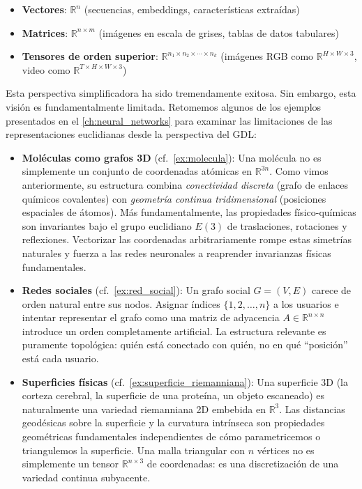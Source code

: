 \begin{itemize}
    \item \textbf{Vectores}: $\mathbb{R}^n$ (secuencias, embeddings, características extraídas)
    \item \textbf{Matrices}: $\mathbb{R}^{n \times m}$ (imágenes en escala de grises, tablas de datos tabulares)
    \item \textbf{Tensores de orden superior}: $\mathbb{R}^{n_1 \times n_2 \times \cdots \times n_k}$ (imágenes RGB como $\mathbb{R}^{H \times W \times 3}$, video como $\mathbb{R}^{T \times H \times W \times 3}$)
\end{itemize}

Esta perspectiva simplificadora ha sido tremendamente exitosa. Sin embargo, esta visión es fundamentalmente limitada. Retomemos algunos de los ejemplos presentados en el \autoref{ch:neural_networks} para examinar las limitaciones de las representaciones euclidianas desde la perspectiva del \gls{GDL}:

\begin{itemize}
    \item \textbf{Moléculas como grafos 3D} (cf.~\autoref{ex:molecula}): Una molécula no es simplemente un conjunto de coordenadas atómicas en $\mathbb{R}^{3n}$. Como vimos anteriormente, su estructura combina \textit{conectividad discreta} (grafo de enlaces químicos covalentes) con \textit{geometría continua tridimensional} (posiciones espaciales de átomos). Más fundamentalmente, las propiedades físico-químicas son invariantes bajo el grupo euclidiano $E(3)$ de traslaciones, rotaciones y reflexiones. Vectorizar las coordenadas arbitrariamente rompe estas simetrías naturales y fuerza a las redes neuronales a reaprender invarianzas físicas fundamentales.

    \item \textbf{Redes sociales} (cf.~\autoref{ex:red_social}): Un grafo social $G = (V, E)$ carece de orden natural entre sus nodos. Asignar índices $\{1, 2, \ldots, n\}$ a los usuarios e intentar representar el grafo como una matriz de adyacencia $A \in \mathbb{R}^{n \times n}$ introduce un orden completamente artificial. La estructura relevante es puramente topológica: quién está conectado con quién, no en qué ``posición'' está cada usuario.

    \item \textbf{Superficies físicas} (cf.~\autoref{ex:superficie_riemanniana}): Una superficie 3D (la corteza cerebral, la superficie de una proteína, un objeto escaneado) es naturalmente una variedad riemanniana 2D embebida en $\mathbb{R}^3$. Las distancias geodésicas sobre la superficie y la curvatura intrínseca son propiedades geométricas fundamentales independientes de cómo parametricemos o triangulemos la superficie. Una malla triangular con $n$ vértices no es simplemente un tensor $\mathbb{R}^{n \times 3}$ de coordenadas: es una discretización de una variedad continua subyacente.
\end{itemize}

